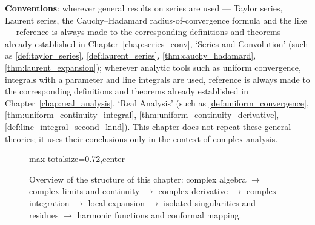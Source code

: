 \begin{remark}
\textbf{Conventions}: wherever general results on series are used --- Taylor series, Laurent series, the Cauchy--Hadamard radius-of-convergence formula and the like --- reference is always made to the corresponding definitions and theorems already established in Chapter~\ref{chap:series_conv}, `Series and Convolution' (such as \cref{def:taylor_series}, \cref{def:laurent_series}, \cref{thm:cauchy_hadamard}, \cref{thm:laurent_expansion}); wherever analytic tools such as uniform convergence, integrals with a parameter and line integrals are used, reference is always made to the corresponding definitions and theorems already established in Chapter~\ref{chap:real_analysis}, `Real Analysis' (such as \cref{def:uniform_convergence}, \cref{thm:uniform_continuity_integral}, \cref{thm:uniform_continuity_derivative}, \cref{def:line_integral_second_kind}). This chapter does not repeat these general theories; it uses their conclusions only in the context of complex analysis.
\end{remark}

\begin{figure}[htbp]
\centering
\begin{adjustbox}{max totalsize={\linewidth}{0.72\textheight},center}
\end{adjustbox}
\caption{Overview of the structure of this chapter: complex algebra $\to$ complex limits and continuity $\to$ complex derivative $\to$ complex integration $\to$ local expansion $\to$ isolated singularities and residues $\to$ harmonic functions and conformal mapping.}
\label{fig:complex_analysis_overview}
\end{figure}

